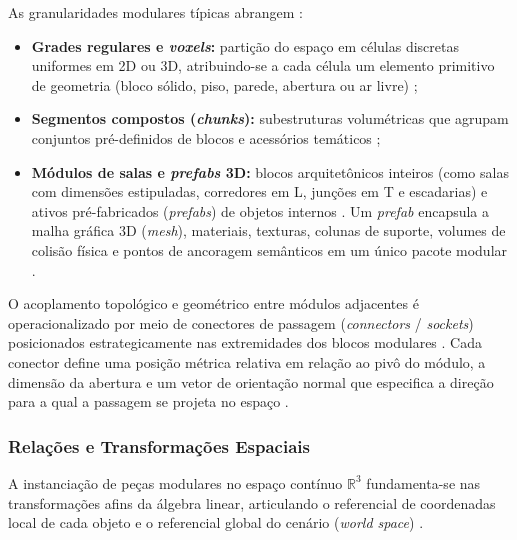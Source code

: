 As granularidades modulares típicas abrangem \cite{linden2014dungeons, shaker2016constructive}:
\begin{itemize}
    \item \textbf{Grades regulares e \textit{voxels}:} partição do espaço em células discretas uniformes em 2D ou 3D, atribuindo-se a cada célula um elemento primitivo de geometria (bloco sólido, piso, parede, abertura ou ar livre) \cite{pcgbook, shaker2016constructive, summerville2018procedural};
    \item \textbf{Segmentos compostos (\textit{chunks}):} subestruturas volumétricas que agrupam conjuntos pré-definidos de blocos e acessórios temáticos \cite{linden2014dungeons, shaker2016constructive};
    \item \textbf{Módulos de salas e \textit{prefabs} 3D:} blocos arquitetônicos inteiros (como salas com dimensões estipuladas, corredores em L, junções em T e escadarias) e ativos pré-fabricados (\textit{prefabs}) de objetos internos \cite{linden2014dungeons, xu2025databasedrivenframework3dlevel, regmi2025system}. Um \textit{prefab} encapsula a malha gráfica 3D (\textit{mesh}), materiais, texturas, colunas de suporte, volumes de colisão física e pontos de ancoragem semânticos em um único pacote modular \cite{xu2025databasedrivenframework3dlevel, regmi2025system}.
\end{itemize}

O acoplamento topológico e geométrico entre módulos adjacentes é operacionalizado por meio de conectores de passagem (\textit{connectors} / \textit{sockets}) posicionados estrategicamente nas extremidades dos blocos modulares \cite{linden2013designing, linden2014dungeons, shaker2016constructive}. Cada conector define uma posição métrica relativa em relação ao pivô do módulo, a dimensão da abertura e um vetor de orientação normal que especifica a direção para a qual a passagem se projeta no espaço \cite{linden2013designing, shaker2016constructive, xu2025databasedrivenframework3dlevel}.

\subsubsection{Relações e Transformações Espaciais}
\label{sec:transformacoes_espaciais}

A instanciação de peças modulares no espaço contínuo $\mathbb{R}^3$ fundamenta-se nas transformações afins da álgebra linear, articulando o referencial de coordenadas local de cada objeto e o referencial global do cenário (\textit{world space}) \cite{ericson2004realtime, xu2025constraint}.

